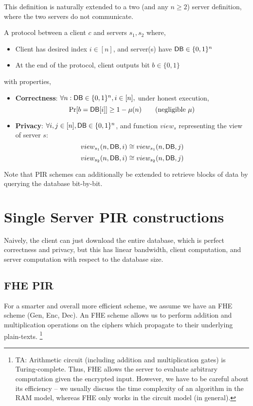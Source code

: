 This definition is naturally extended to a two (and any $n \geq 2$) server definition, where the two servers do not communicate.




\begin{definition}
A protocol between a client $c$ and servers $s_{1},s_{2}$ where,
\begin{itemize}
	\item Client has desired index $i \in [n]$, and server(s) have ${\sf DB} \in \{0,1\}^n$
	\item At the end of the protocol, client outputs bit $b \in \{0,1\}$
\end{itemize}
with properties,
\begin{itemize}

	\item \textbf{Correctness}: $\forall n: {\sf DB} \in \{0,1\}^n, i \in [n],$ under honest execution, 
	\[\Pr[b = {\sf DB}[i]] \geq 1 - \mu(n) \tag{negligible $\mu$}\]
	
	\item \textbf{Privacy}: $\forall i,j \in [n], {\sf DB}  \in \{0,1\}^n$, and function $view_{s}$ representing the view of server $s$:
	\[view_{s_{1}}(n,{\sf DB},i) \cong view_{s_{1}}(n,{\sf DB},j)\]
	\[view_{s_{2}}(n,{\sf DB},i) \cong view_{s_{2}}(n,{\sf DB},j)\]
\end{itemize}
\end{definition}


Note that PIR schemes can additionally be extended to retrieve blocks of data by querying the database bit-by-bit.
\section{Single Server PIR constructions}
Naively, the client can just download the entire database, which is perfect correctness and privacy, but this has linear bandwidth, client computation, and server computation with respect to the database size.

\subsection{FHE PIR}
For a smarter and overall more efficient scheme, we assume we have an FHE scheme (Gen, Enc, Dec). An FHE scheme allows us to perform addition and multiplication operations on the ciphers which propagate to their underlying plain-texts.
\footnote{TA:
Arithmetic circuit (including addition and multiplication gates) is Turing-complete. Thus, FHE allows the server to evaluate arbitrary computation given the encrypted input. However, we have to be careful about its efficiency -- we usually discuss the time complexity of an algorithm in the RAM model, whereas FHE only works in the circuit model (in general).}

